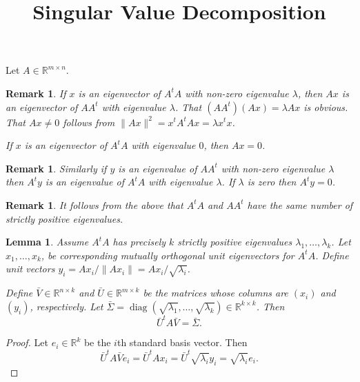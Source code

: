 \documentclass{article}
\title{Singular Value Decomposition}
\newtheorem{lemma}[theorem]{Lemma}
\newtheorem{remark}[theorem]{Remark}
\DeclareMathOperator{\diag}{diag}
\newcommand{\trans}{t}
\begin{document}
\maketitle
Let $A \in \mathbb{R}^{m \times n}$.

\begin{remark}
If $x$ is an eigenvector of $A^\trans A$ with non-zero eigenvalue $\lambda$, then $Ax$ is an eigenvector of $AA^\trans$ with eigenvalue $\lambda$. That $(AA^\trans)(Ax) = \lambda Ax$ is obvious. That $Ax \neq 0$ follows from $\|Ax\|^2 = x^\trans A^\trans A x = \lambda x^\trans x$.

If $x$ is an eigenvector of $A^\trans A$ with eigenvalue $0$, then $Ax = 0$.
\end{remark}

\begin{remark}
Similarly if $y$ is an eigenvalue of $AA^\trans$ with non-zero eigenvalue $\lambda$ then $A^\trans y$ is an eigenvalue of $A^\trans A$ with eigenvalue $\lambda$. If $\lambda$ is zero then $A^\trans y = 0$.
\end{remark}

\begin{remark}
It follows from the above that $A^\trans A$ and $AA^\trans$ have the same number of strictly positive eigenvalues. 
\end{remark}

\begin{lemma}
Assume $A^\trans A$ has precisely $k$ strictly positive eigenvalues $\lambda_1, \ldots, \lambda_k$. Let $x_1, \ldots, x_k$, be corresponding mutually orthogonal unit eigenvectors for $A^\trans A$. Define unit vectors $y_i = Ax_i / \|Ax_i\| = Ax_i / \sqrt{\lambda_i}$.

Define $\bar{V} \in \mathbb{R}^{n \times k}$ and $\bar{U} \in \mathbb{R}^{m \times k}$ be the matrices whose columns are $(x_i)$ and $(y_i)$, respectively. Let 
$\bar{\Sigma} = \diag(\sqrt{\lambda_1}, \ldots, \sqrt{\lambda_k}) \in \mathbb{R}^{k \times k}$. Then
\begin{equation}
\bar{U}^\trans A \bar{V} = \bar{\Sigma} .
\end{equation}
\end{lemma}
\begin{proof}
Let $e_i \in \mathbb{R}^k$ be the $i$th standard basis vector. Then
\begin{equation}
\bar{U}^\trans A \bar{V} e_i = \bar{U}^\trans A x_i = \bar{U}^\trans \sqrt{\lambda_i} y_i = \sqrt{\lambda_i} e_i .
\end{equation}
\end{proof}
\end{document}

